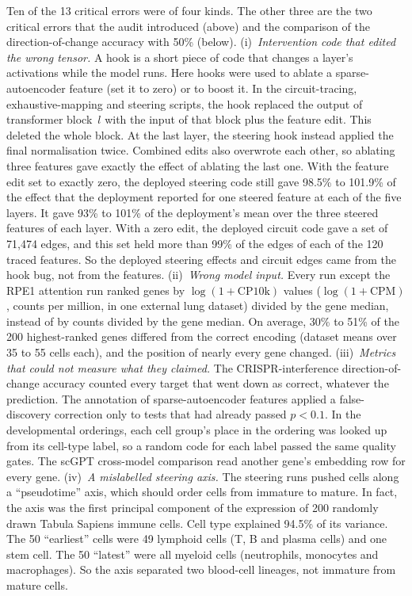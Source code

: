 Ten of the 13 critical errors were of four kinds. The other three are
the two critical errors that the audit introduced (above) and the
comparison of the direction-of-change accuracy with 50\% (below).
(i)~\emph{Intervention code that
edited the wrong tensor.} A hook is a short piece of code that changes a
layer's activations while the model runs. Here hooks were used to ablate
a sparse-autoencoder feature (set it to zero) or to boost it. In the
circuit-tracing, exhaustive-mapping and steering scripts, the hook
replaced the output of transformer block~$l$ with the input of that block
plus the feature edit. This deleted the whole block. At the last layer,
the steering hook instead applied the final normalisation twice.
Combined edits also overwrote each other, so ablating three features gave
exactly the effect of ablating the last one. With the feature edit set to
exactly zero, the deployed steering code still gave 98.5\% to 101.9\% of
the effect that the deployment reported for one steered feature at each
of the five layers. It gave 93\% to 101\% of the deployment's mean over
the three steered features of each layer. With a zero edit, the deployed
circuit code gave a set of 71,474 edges, and this set held more than 99\% of the edges of
each of the 120 traced features. So the deployed steering effects and
circuit edges came from the hook bug, not from the features.
(ii)~\emph{Wrong model input.} Every run except the RPE1 attention run
ranked genes by $\log(1+\text{CP10k})$ values ($\log(1+\text{CPM})$,
counts per million, in one external lung dataset) divided by the gene
median, instead of by counts divided by the gene median. On average,
30\% to 51\% of the 200 highest-ranked genes differed from the correct
encoding (dataset means over 35 to 55 cells each), and the position of
nearly every gene changed. (iii)~\emph{Metrics that could not measure
what they claimed.} The CRISPR-interference direction-of-change accuracy
counted every target that went down as correct, whatever the prediction.
The annotation of sparse-autoencoder features applied a false-discovery
correction only to tests that had already passed $p<0.1$. In the
developmental orderings, each cell group's place in the ordering was
looked up from its cell-type label, so a random code for each label
passed the same quality gates. The scGPT cross-model comparison read
another gene's embedding row for every gene. (iv)~\emph{A mislabelled
steering axis.} The steering runs pushed cells along a ``pseudotime''
axis, which should order cells from immature to mature. In fact, the
axis was the first principal component of the expression of 200 randomly
drawn Tabula Sapiens immune cells. Cell type explained 94.5\% of its
variance. The 50 ``earliest'' cells were 49 lymphoid cells (T, B and
plasma cells) and one stem cell. The 50 ``latest'' were all myeloid cells
(neutrophils, monocytes and macrophages). So the axis separated two
blood-cell lineages, not immature from mature cells.

